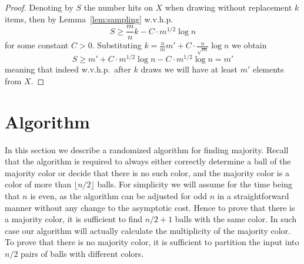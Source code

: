 \documentclass{article}[11pt,a4paper]
\begin{document}
\begin{proof}
Denoting by $S$ the number hits on $X$ when drawing without replacement $k$ items, then
by Lemma~\ref{lem:sampling} w.v.h.p.
\[S \ge \frac{m}{n}k - C \cdot m^{1/2} \log n\]
for some constant $C>0$. Substituting $k = \frac{n}{m}m' + C\cdot \frac{n}{\sqrt{m}} \log n$ we obtain
\[S  \ge m' + C \cdot m^{1/2} \log n - C \cdot m^{1/2} \log n = m'\]
meaning that indeed w.v.h.p.\ after $k$ draws we will have at least $m'$ elements from $X$.
\end{proof}

\section{Algorithm}

In this section we describe a randomized algorithm for finding majority. Recall
that the algorithm is required to always either correctly determine a ball of the majority
color or decide that there is no such color, and the majority color is a color of more
than $\lfloor n/2\rfloor$ balls. For simplicity we will assume for the time being that
$n$ is even, as the algorithm can be adjusted for odd $n$ in a straightforward manner without any change to the asymptotic cost.
Hence to prove that there is a majority color, it is sufficient to find $n/2+1$ balls
with the same color. In such case our algorithm will actually calculate the multiplicity
of the majority color. To prove that there is no majority color, it is sufficient to partition
the input into $n/2$ pairs of balls with different colors.

\pagebreak
\end{document}
